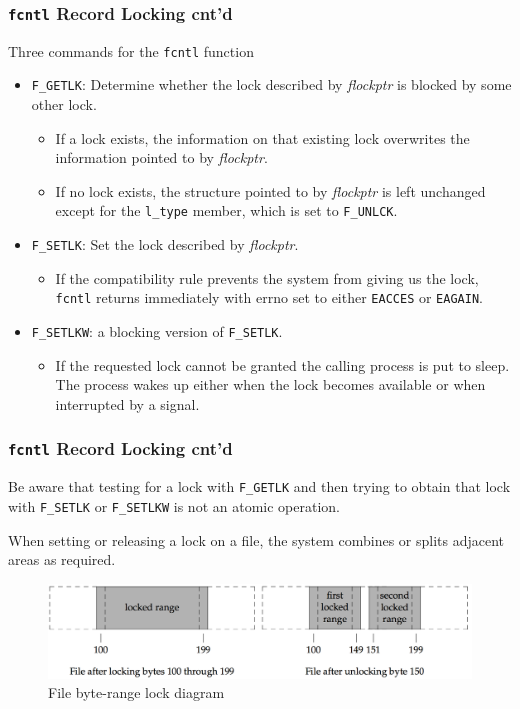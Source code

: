 \documentclass[newPxFont,sthlmFooter,nooffset]{beamer}
\begin{document}
\begin{frame}[t]
  \frametitle{\texttt{fcntl} Record Locking cnt'd}

Three commands for the \texttt{fcntl} function
  \begin{itemize}
  \item \texttt{F\_GETLK}: Determine whether the lock described by \textit{flockptr} is blocked by some other lock.
{\footnotesize
    \begin{itemize}
    \item If a lock exists, the information on that existing lock
      overwrites the information pointed to by \textit{flockptr}.
    \item If no lock exists, the structure pointed to by \textit{flockptr} is
      left unchanged except for the \texttt{l\_type} member, which is
      set to \texttt{F\_UNLCK}.
    \end{itemize}
}
  \item \texttt{F\_SETLK}:  Set the lock described by \textit{flockptr}.
{\footnotesize
    \begin{itemize}
    \item If the compatibility rule prevents the system from giving us
      the lock, \texttt{fcntl} returns immediately with errno set to
      either \texttt{EACCES} or \texttt{EAGAIN}.
    \end{itemize}
}
  \item \texttt{F\_SETLKW}: a blocking version of \texttt{F\_SETLK}.
{\footnotesize
    \begin{itemize}
    \item If the requested lock cannot be granted the calling process
      is put to sleep. The process wakes up either when the lock
      becomes available or when interrupted by a signal.
    \end{itemize}
}
  \end{itemize}
\end{frame}

\begin{frame}[t]
  \frametitle{\texttt{fcntl} Record Locking cnt'd}
Be aware that testing for a lock with \texttt{F\_GETLK} and then trying to obtain that lock with \texttt{F\_SETLK} or \texttt{F\_SETLKW} is not an atomic operation.

When setting or releasing a lock on a file, the system combines or splits adjacent areas as required.

  \begin{figure}[h]
   \centering
    \includegraphics[width=1\linewidth]{figures/fig14_4-file.png}
    \caption{File byte-range lock diagram}
  \end{figure}
\end{frame}
\end{document}
